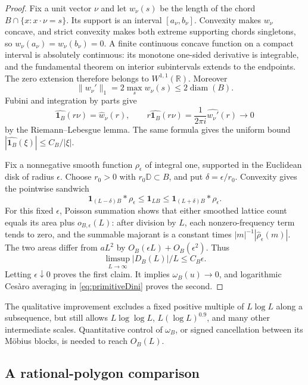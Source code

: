 \documentclass[11pt,a4paper]{article}
\numberwithin{equation}{section}
\theoremstyle{definition}
\theoremstyle{remark}
\begin{document}
\begin{proof}
Fix a unit vector $\nu$ and let $w_\nu(s)$ be the length of the
chord $B\cap\{x:x\cdot\nu=s\}$. Its support is an interval
$[a_\nu,b_\nu]$. Convexity makes $w_\nu$ concave, and strict
convexity makes both extreme supporting chords singletons, so
$w_\nu(a_\nu)=w_\nu(b_\nu)=0$. A finite continuous concave
function on a compact interval is absolutely continuous: its
monotone one-sided derivative is integrable, and the fundamental
theorem on interior subintervals extends to the endpoints.
The zero extension therefore belongs to $W^{1,1}(\mathbb R)$.
Moreover
\[
 \|w_\nu'\|_1=2\max_s w_\nu(s)\le2\operatorname{diam}(B).
\]
Fubini and integration by parts give
\[
 \widehat{\mathbf1_B}(r\nu)=\widehat w_\nu(r),\qquad
 r\widehat{\mathbf1_B}(r\nu)
   =\frac1{2\pi i}\widehat{w_\nu'}(r)\longrightarrow0
\]
by the Riemann--Lebesgue lemma. The same formula gives the uniform
bound $|\widehat{\mathbf1_B}(\xi)|\le C_B/|\xi|$.

Fix a nonnegative smooth function $\rho_\epsilon$ of integral one,
supported in the Euclidean disk of radius $\epsilon$. Choose $r_0>0$
with $r_0\mathbb D\subset B$, and put $\delta=\epsilon/r_0$.
Convexity gives the pointwise sandwich
\[
 \mathbf1_{(L-\delta)B}*\rho_\epsilon
 \le\mathbf1_{LB}
 \le\mathbf1_{(L+\delta)B}*\rho_\epsilon.
\]
For this fixed $\epsilon$, Poisson summation shows that either
smoothed lattice count equals its area plus $o_{B,\epsilon}(L)$: after division
by $L$, each nonzero-frequency term tends to zero, and the summable
majorant is a constant times
$|m|^{-1}|\widehat\rho_\epsilon(m)|$.
The two areas differ from $aL^2$ by $O_B(\epsilon L)+O_B(\epsilon^2)$.
Thus
\[
 \limsup_{L\to\infty}|D_B(L)|/L\le C_B\epsilon.
\]
Letting $\epsilon\downarrow0$ proves the first claim. It implies
$\omega_B(u)\to0$, and logarithmic Ces\`aro averaging in
\eqref{eq:primitiveDini} proves the second.
\end{proof}

The qualitative improvement excludes a fixed positive multiple of
$L\log L$ along a subsequence, but still allows $L\log\log L$,
$L(\log L)^{0.9}$, and many other intermediate scales. Quantitative
control of $\omega_B$, or signed cancellation between its M\"obius
blocks, is needed to reach $O_B(L)$.

\subsection{A rational-polygon comparison}
\label{subsec:rationalpolygonbenchmark}
\end{document}

